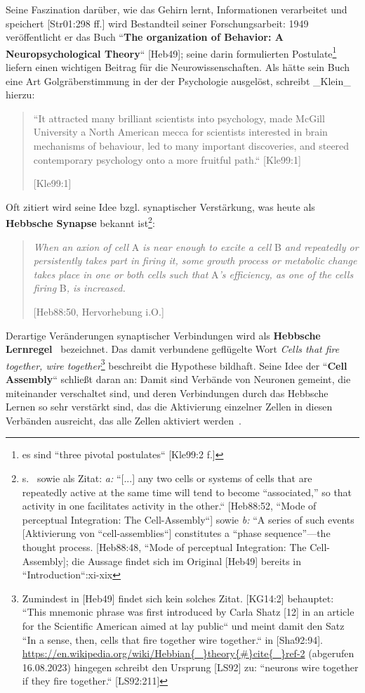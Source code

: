 Seine Faszination darüber, wie das Gehirn lernt, Informationen verarbeitet und speichert [Str01:298 ff.] wird Bestandteil seiner Forschungsarbeit: 1949 veröffentlicht er das Buch ``\textbf{The organization of Behavior: A Neuropsychological Theory}`` [Heb49]; seine darin formulierten Postulate\footnote{
    es sind ``three pivotal postulates`` {[Kle99:2 f.]}
} liefern einen wichtigen Beitrag für die Neurowissenschaften. Als hätte sein Buch eine Art Golgräberstimmung in der der Psychologie ausgelöst, schreibt _Klein_ hierzu:

\blockquote[{[Kle99:1]}]{
    ``It attracted many
    brilliant scientists into psychology, made McGill University a North American mecca for scientists interested in brain mechanisms of behaviour, led to many important discoveries, and steered contemporary psychology onto a more fruitful path.`` [Kle99:1]
}

Oft zitiert wird seine Idee bzgl. synaptischer Verstärkung, was heute als \textbf{Hebbsche Synapse} bekannt ist\footnote{
    s.~\cite[43]{AR88} sowie als Zitat: \textit{a:} ``[...] any two cells or systems of cells that are repeatedly active at the same time will tend to become “associated,” so that activity in one facilitates activity in the other.`` [Heb88:52, ``Mode of perceptual Integration: The Cell-Assembly``] sowie \textit{b:} ``A series of such events [Aktivierung von ``cell-assemblies``] constitutes a “phase sequence”—the thought process. [Heb88:48, ``Mode of perceptual Integration: The Cell-Assembly]; die Aussage findet sich im Original [Heb49] bereits in ``Introduction``:xi-xix
}:

\blockquote[{[Heb88:50, Hervorhebung i.O.]}]{
    \textit{When an axion of cell} A \textit{is near enough to excite a cell} B \textit{and repeatedly or persistently takes part in firing it, some growth process or metabolic change takes place in one or both cells such that} A\textit{'s efficiency, as one of the cells firing} B\textit{, is increased.}
}


Derartige Veränderungen synaptischer Verbindungen wird als \textbf{Hebbsche Lernregel}~\cite[985]{BCP18} bezeichnet.
Das damit verbundene geflügelte Wort \textit{Cells that fire together, wire together}\footnote{
    Zumindest in [Heb49] findet sich kein solches Zitat. [KG14:2] behauptet: ``This mnemonic phrase was first introduced by Carla Shatz [12] in an article for the Scientific American aimed at lay public`` und meint damit den Satz ``In a sense, then, cells that fire together wire together.`` in [Sha92:94]. \url{https://en.wikipedia.org/wiki/Hebbian{\_}theory{\#}cite{\_}ref-2} (abgerufen 16.08.2023) hingegen schreibt den Ursprung [LS92] zu: ``neurons wire together if they fire together.`` [LS92:211]
} beschreibt die Hypothese bildhaft.
Seine Idee der ``\textbf{Cell Assembly}`` schließt daran an: Damit sind Verbände von Neuronen gemeint, die miteinander verschaltet sind, und deren Verbindungen durch das Hebbsche Lernen so sehr verstärkt sind, das die Aktivierung einzelner Zellen in diesen Verbänden ausreicht, das alle Zellen aktiviert werden~\cite[907 f.]{BCP18}.


